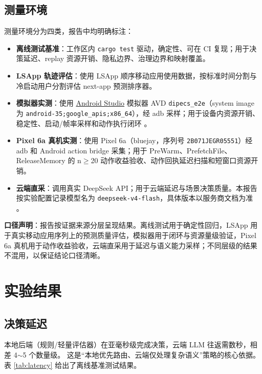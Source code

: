 \documentclass[12pt,a4paper]{article}
\begin{document}
\subsection{测量环境}\label{subsec:environment}

测量环境分为四类，报告中均明确标注：

\begin{itemize}
  \item \textbf{离线测试基准}：工作区内 \texttt{cargo test} 驱动，确定性、可在 CI 复现；用于决策延迟、replay 资源开销、隐私边界、治理边界和映射覆盖。
  \item \textbf{LSApp 轨迹评估}：使用 LSApp 顺序移动应用使用数据，按标准时间分割与冷启动用户分割评估 next-app 预测排序器。
  \item \textbf{模拟器实测}：使用 \href{https://developer.android.com/studio}{Android Studio} 模拟器 AVD \texttt{dipecs\_e2e}（system image 为 \texttt{android-35;\allowbreak google\_apis;\allowbreak x86\_64}），经 adb 采样；用于设备内资源开销、稳定性、启动/帧率采样和动作执行闭环 \cite{android-emulator,android-api-35}。
  \item \textbf{Pixel 6a 真机实测}：使用 Pixel 6a（bluejay，序列号 \texttt{2B071JEGR05551}）经 adb 和 Android action bridge 采集；用于 PreWarm、PrefetchFile、ReleaseMemory 的 n$\ge$20 动作收益验收、动作回执延迟扫描和短窗口资源开销。
  \item \textbf{云端直采}：调用真实 DeepSeek API；用于云端延迟与场景决策质量。本报告按实验配置记录模型名为 \texttt{deepseek-v4-flash}，具体版本以服务商文档为准 \cite{deepseek-api}。
\end{itemize}

\textbf{口径声明}：报告按证据来源分层呈现结果。离线测试用于确定性回归，LSApp 用于真实移动应用序列上的预测质量评估，模拟器用于闭环与资源量级验证，Pixel 6a 真机用于动作收益验收，云端直采用于延迟与语义能力采样；不同层级的结果不混用，以保证结论口径清晰。

\section{实验结果}\label{sec:results}

\subsection{决策延迟}\label{subsec:latency}

本地后端（规则/轻量评估器）在亚毫秒级完成决策，云端 LLM 往返需数秒，相差 4$\sim$5 个数量级。
这是``本地优先路由、云端仅处理复杂语义''策略的核心依据。
表 \ref{tab:latency} 给出了离线基准测试结果。
\end{document}
